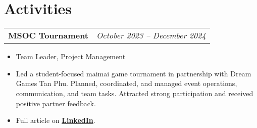\documentclass[a4paper,11pt]{article}
\makeatletter
\newenvironment{joblong}[2]
    {
    \begin{tabularx}{\linewidth}{@{}l r@{}}
    \textbf{#1} & #2 \\[2pt]
    \end{tabularx}
    \begin{itemize}[nosep,leftmargin=1.5em,itemsep=2pt,label=--]
    }
    {
    \end{itemize}
    }
\makeatother
\begin{document}
\section{Activities}
\begin{joblong}{MSOC Tournament}{\hspace*{0.5\linewidth}\small\textit{October 2023 -- December 2024}}
\item Team Leader, Project Management
\item Led a student-focused maimai game tournament in partnership with Dream Games Tan Phu. Planned, coordinated, and managed event operations, communication, and team tasks. Attracted strong participation and received positive partner feedback. 
\item Full article on \href{https://www.linkedin.com/feed/update/urn:li:activity:7300042302784233472/}{\textbf{\underline{LinkedIn}}}.
\end{joblong}



\vspace*{\fill}
\end{document}
